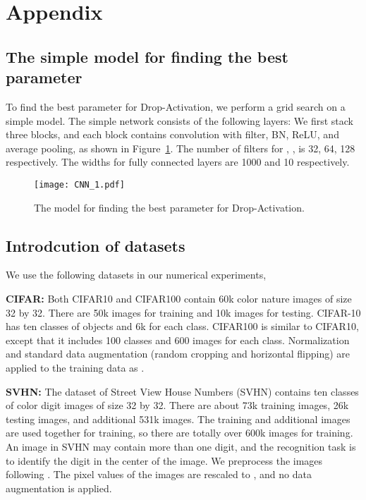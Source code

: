 \documentclass[11pt]{article}
\begin{document}
\section{Appendix}
\subsection{The simple model for finding the best parameter }
To find the best parameter for Drop-Activation, we perform a grid search on a simple model. The simple network consists of the following layers: We first stack three blocks, and each block contains convolution with  filter, BN, ReLU, and average pooling, as shown in Figure~\ref{fig:simplemodel}. The number of  filters for , ,  is 32, 64, 128 respectively. The widths for fully connected layers are 1000 and 10 respectively.
\begin{figure}[ht]
  \centering
\texttt{[image: CNN\_1.pdf]}\\
  \caption{The model for finding the best parameter for Drop-Activation.}\label{fig:simplemodel}
\end{figure}

\subsection{Introdcution of datasets}
We use the following datasets in our numerical experiments,

\textbf{CIFAR:} Both CIFAR10 and CIFAR100 contain 60k color nature images of size 32 by 32. There are 50k images for training and 10k images for testing. CIFAR-10 has ten classes of objects and 6k for each class. CIFAR100 is similar to CIFAR10, except that it includes 100 classes and 600 images for each class. Normalization and standard data augmentation (random cropping and horizontal flipping) are applied to the training data as \cite{resnet}.


\textbf{SVHN:} The dataset of Street View House Numbers (SVHN) contains ten classes of color digit images of size 32 by 32. There are about 73k training images, 26k testing images, and additional 531k images. The training and additional images are used together for training, so there are totally over 600k images for training. An image in SVHN may contain more than one digit, and the recognition task is to identify the digit in the center of the image. We preprocess the images following \cite{wrn}. The pixel values of the images are rescaled to , and no data augmentation is applied.
\end{document}
